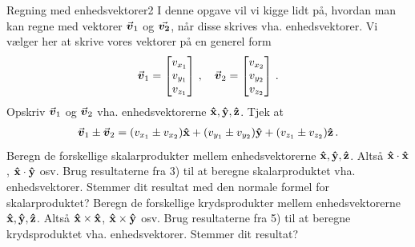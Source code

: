 \begin{opgave}{Regning med enhedsvektorer}{2}
I denne opgave vil vi kigge lidt på, hvordan man kan regne med vektorer ${\vec{\boldsymbol{v}}}_1$ og  ${\vec{\boldsymbol{v_2}}}$, når disse skrives vha. enhedsvektorer. Vi vælger her at skrive vores vektorer på en generel form
\begin{align*}
{\vec{\boldsymbol{v}}}_1 = \begin{bmatrix} v_{x_1} \\ v_{y_1} \\ v_{z_1} \end{bmatrix} \, , \quad {\vec{\boldsymbol{v}}}_2 = \begin{bmatrix} v_{x_2} \\ v_{y_2} \\ v_{z_2} \end{bmatrix}  \, .
\end{align*}
\opg Opskriv ${\vec{\boldsymbol{v}}}_1$ og ${\vec{\boldsymbol{v}}}_2$ vha. enhedsvektorerne $\mathbf{\hat{x}},\mathbf{\hat{y}},\mathbf{\hat{z}}$.
\opg Tjek at
\begin{align*}
{\vec{\boldsymbol{v}}}_1 \pm {\vec{\boldsymbol{v}}}_2 = (v_{x_1} \pm v_{x_2}) \mathbf{\hat{x}} + (v_{y_1} \pm v_{y_2}) \mathbf{\hat{y}} + (v_{z_1} \pm v_{z_2}) \mathbf{\hat{z}} \, .
\end{align*}
\opg Beregn de forskellige skalarprodukter mellem enhedsvektorerne $\mathbf{\hat{x}},\mathbf{\hat{y}},\mathbf{\hat{z}}$. Altså $\mathbf{\hat{x}} \cdot \mathbf{\hat{x}}$, $\mathbf{\hat{x}} \cdot \mathbf{\hat{y}}$ osv.
\opg Brug resultaterne fra 3) til at beregne skalarproduktet vha. enhedsvektorer. Stemmer dit resultat med den normale formel for skalarproduktet?
\opg Beregn de forskellige krydsprodukter mellem enhedsvektorerne $\mathbf{\hat{x}},\mathbf{\hat{y}},\mathbf{\hat{z}}$. Altså $\mathbf{\hat{x}} \times \mathbf{\hat{x}}$, $\mathbf{\hat{x}} \times \mathbf{\hat{y}}$ osv.
\opg Brug resultaterne fra 5) til at beregne krydsproduktet vha. enhedsvektorer. Stemmer dit resultat?
\end{opgave}
